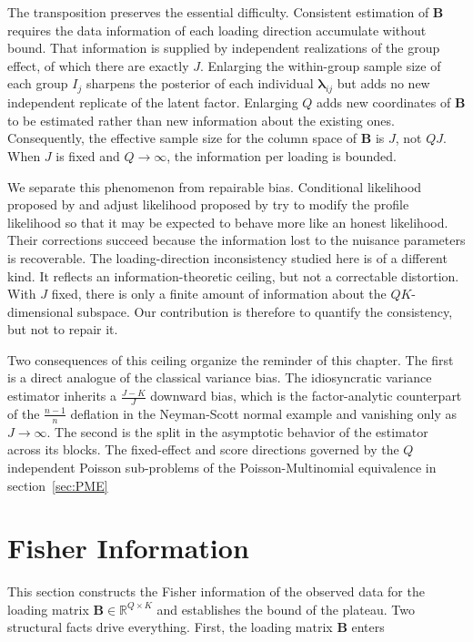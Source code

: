 The transposition preserves the essential difficulty. Consistent estimation of $\mathbf{B}$ requires the data information of each loading direction accumulate without bound. That information is supplied by independent realizations of the group effect, of which there are exactly $J$. Enlarging the within-group sample size of each group $I_{j}$ sharpens the posterior of each individual $\bm{\lambda}_{ij}$ but adds no new independent replicate of the latent factor. Enlarging $Q$ adds new coordinates of $\mathbf{B}$ to be estimated rather than new information about the existing ones. Consequently, the effective sample size for the column space of $\mathbf{B}$ is $J$, not $QJ$. When $J$ is fixed and $Q\to\infty$, the information per loading is bounded.

We separate this phenomenon from repairable bias. Conditional likelihood proposed by \citet{10.1093/biomet/74.4.695} and adjust likelihood proposed by \citet{10.1111/j.2517-6161.1990.tb01790.x} try to modify the profile likelihood so that it may be expected to behave more like an honest likelihood. Their corrections succeed because the information lost to the nuisance parameters is recoverable. The loading-direction inconsistency studied here is of a different kind. It reflects an information-theoretic ceiling, but not a correctable distortion. With $J$ fixed, there is only a finite amount of information about the $QK$-dimensional subspace. Our contribution is therefore to quantify the consistency, but not to repair it.

Two consequences of this ceiling organize the reminder of this chapter. The first is a direct analogue of the classical variance bias. The idiosyncratic variance estimator inherits a $\frac{J-K}{J}$ downward bias, which is the factor-analytic counterpart of the $\frac{n-1}{n}$ deflation in the Neyman-Scott normal example and vanishing only as $J\to\infty$. The second is the split in the asymptotic behavior of the estimator across its blocks. The fixed-effect and score directions governed by the $Q$ independent Poisson sub-problems of the Poisson-Multinomial equivalence in section~\ref{sec:PME}

\section{Fisher Information}
\label{sec:fisher-info}

This section constructs the Fisher information of the observed data for the loading matrix $\mathbf{B}\in\mathbb{R}^{Q\times K}$ and establishes the bound of the plateau. Two structural facts drive everything. First, the loading matrix $\mathbf{B}$ enters 

